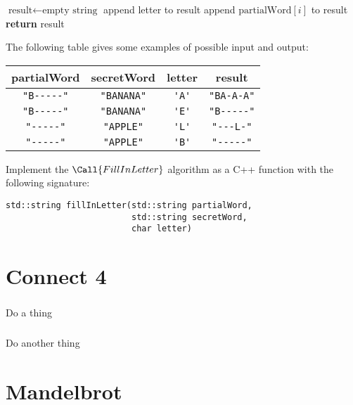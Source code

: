 \documentclass{scrartcl}
\begin{document}
\noindent\begin{algorithmic}
		\State $\text{result} \gets \text{empty string}$
				\State append letter to result
			\Else
				\State append $\text{partialWord}[i]$ to result
			\EndIf
		\EndFor
		\State \textbf{return} result
	\EndProcedure
\end{algorithmic}

The following table gives some examples of possible input and output:

\begin{center}
\begin{tabular}{|ccc|c|}
\hline
partialWord & secretWord & letter & result \\ \hline
\lstinline{"B-----"} & \lstinline{"BANANA"} & \lstinline{'A'} & \lstinline{"BA-A-A"} \\ \hline
\lstinline{"B-----"} & \lstinline{"BANANA"} & \lstinline{'E'} & \lstinline{"B-----"} \\ \hline
\lstinline{"-----"} & \lstinline{"APPLE"} & \lstinline{'L'} & \lstinline{"---L-"} \\ \hline
\lstinline{"-----"} & \lstinline{"APPLE"} & \lstinline{'B'} & \lstinline{"-----"} \\ \hline
\end{tabular}
\end{center}

Implement the $\Call{FillInLetter}$ algorithm as a C++ function with the following signature:

\begin{lstlisting}
std::string fillInLetter(std::string partialWord,
                         std::string secretWord,
                         char letter)
\end{lstlisting}

\clearpage
\part{Connect 4}

\section{}
Do a thing

\section{}
Do another thing

\clearpage
\part{Mandelbrot}
\end{document}

